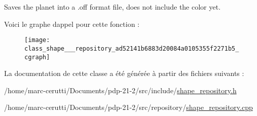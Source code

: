 Saves the planet into a .off format file, does not include the color yet. 

Voici le graphe d\textquotesingle{}appel pour cette fonction \+:\nopagebreak
\begin{figure}[H]
\begin{center}
\leavevmode
\texttt{[image: class\_shape\_\_\_repository\_ad52141b6883d20084a0105355f2271b5\_cgraph]}
\end{center}
\end{figure}


La documentation de cette classe a été générée à partir des fichiers suivants \+:\begin{DoxyCompactItemize}
\item 
/home/marc-\/cerutti/\+Documents/pdp-\/21-\/2/src/include/\hyperlink{shape__repository_8h}{shape\+\_\+repository.\+h}\item 
/home/marc-\/cerutti/\+Documents/pdp-\/21-\/2/src/repository/\hyperlink{shape__repository_8cpp}{shape\+\_\+repository.\+cpp}\end{DoxyCompactItemize}
